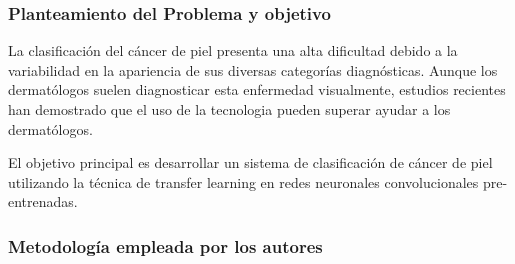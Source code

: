 \subsubsection{Planteamiento del Problema y objetivo}

La clasificación del cáncer de piel presenta una alta dificultad debido a la variabilidad en la apariencia de sus diversas categorías diagnósticas. Aunque los dermatólogos suelen diagnosticar esta enfermedad visualmente, estudios recientes han demostrado que el uso de la  tecnologia pueden superar ayudar a los dermatólogos.

El objetivo principal es desarrollar un sistema de clasificación de cáncer de piel utilizando la técnica de transfer learning en redes neuronales convolucionales pre-entrenadas.

\subsubsection{Metodología empleada por los autores}

\newcommand{\MEDMone}{Adquisición de la data: Se uso una base de datos llamada HAM10000 compuesta por 10015 imágenes dermatoscópicas. De donde se dibirieron las imagenes en siete difetentes tipos de cancer de piel}

